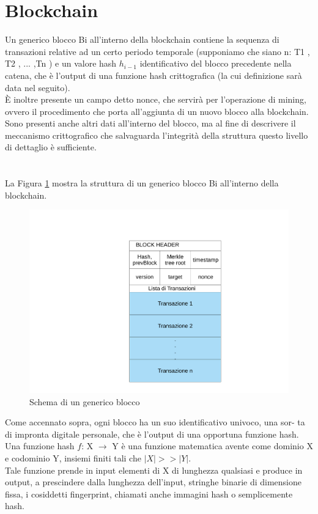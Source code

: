 \section{Blockchain}
Un generico blocco Bi all’interno della blockchain contiene la sequenza di transazioni relative ad un certo periodo temporale (supponiamo che siano n: T1 , T2 , ... ,Tn ) e un valore hash $h_{i-1}$ identificativo del blocco precedente nella catena, che è l’output di una funzione hash crittografica (la cui definizione sarà data nel seguito).\\È inoltre presente un campo detto nonce, che servirà per l’operazione di mining, ovvero il procedimento che porta all’aggiunta di un nuovo blocco alla blockchain. Sono presenti anche altri dati all’interno del blocco, ma al fine di descrivere il meccanismo crittografico che salvaguarda l’integrità della struttura questo livello di dettaglio è sufficiente.\\\\\\La Figura \ref{fig:blocchi} mostra la struttura di un generico blocco Bi all’interno della blockchain.
\begin{figure}[h!]
    \centering
    \includegraphics[scale=0.4, trim = 0cm 0cm 0cm 3cm, clip]{Images/blocco_singolo.pdf}
    \caption{Schema di un generico blocco}
    \label{fig:blocchi}
\end{figure}
\FloatBarrier
Come accennato sopra, ogni blocco ha un suo identificativo univoco, una sor-
ta di impronta digitale personale, che è l’output di una opportuna funzione
hash.\\
Una funzione hash $f$: X $\longrightarrow$ Y è una funzione matematica avente come dominio X e codominio Y, insiemi finiti tali che $|X| >> |Y |$.\\Tale funzione prende in input elementi di X di lunghezza qualsiasi e produce in output, a prescindere dalla lunghezza dell’input, stringhe binarie di dimensione fissa, i cosiddetti fingerprint, chiamati anche immagini hash o semplicemente hash.\\
